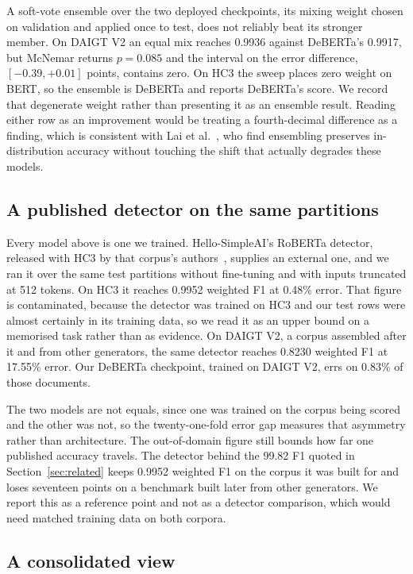 A soft-vote ensemble over the two deployed checkpoints, its mixing weight chosen on validation and applied once to test, does not reliably beat its stronger member. On DAIGT V2 an equal mix reaches 0.9936 against DeBERTa's 0.9917, but McNemar returns $p=0.085$ and the interval on the error difference, $[-0.39, +0.01]$ points, contains zero. On HC3 the sweep places zero weight on BERT, so the ensemble is DeBERTa and reports DeBERTa's score. We record that degenerate weight rather than presenting it as an ensemble result. Reading either row as an improvement would be treating a fourth-decimal difference as a finding, which is consistent with Lai et al.~\cite{Lai2024adaptive}, who find ensembling preserves in-distribution accuracy without touching the shift that actually degrades these models.

\subsection{A published detector on the same partitions}
\label{sec:published}

Every model above is one we trained. Hello-SimpleAI's RoBERTa detector, released with HC3 by that corpus's authors~\cite{HelloSimpleAI2023detector}, supplies an external one, and we ran it over the same test partitions without fine-tuning and with inputs truncated at 512 tokens. On HC3 it reaches 0.9952 weighted F1 at 0.48\% error. That figure is contaminated, because the detector was trained on HC3 and our test rows were almost certainly in its training data, so we read it as an upper bound on a memorised task rather than as evidence. On DAIGT V2, a corpus assembled after it and from other generators, the same detector reaches 0.8230 weighted F1 at 17.55\% error. Our DeBERTa checkpoint, trained on DAIGT V2, errs on 0.83\% of those documents.

The two models are not equals, since one was trained on the corpus being scored and the other was not, so the twenty-one-fold error gap measures that asymmetry rather than architecture. The out-of-domain figure still bounds how far one published accuracy travels. The detector behind the 99.82 F1 quoted in Section~\ref{sec:related} keeps 0.9952 weighted F1 on the corpus it was built for and loses seventeen points on a benchmark built later from other generators. We report this as a reference point and not as a detector comparison, which would need matched training data on both corpora.

\subsection{A consolidated view}

